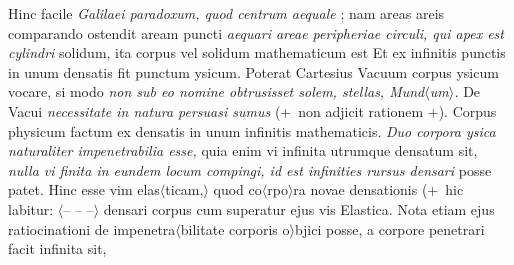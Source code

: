 Hinc facile
\textit{Galilaei\protect{}
paradoxum, quod centrum aequale
};
nam areas areis comparando ostendit aream puncti
\textit{aequari areae peripheriae circuli, qui apex est cylindri
}
solidum, ita corpus vel solidum mathematicum est 
Et ex infinitis punctis in unum densatis fit punctum ysicum.
\pend 
\pstart  Poterat Cartesius\protect{}
Vacuum corpus ysicum vocare, si modo \textit{non sub eo nomine obtrusisset solem\protect{}, stellas\protect{}, Mund$\langle$um$\rangle$.} De Vacui \textit{necessitate in natura persuasi sumus} (+~non adjicit rationem +). 
\pend 
\pstart%
Corpus physicum factum ex densatis in unum infinitis mathematicis.
\textit{Duo corpora ysica naturaliter impenetrabilia esse,}
quia enim vi infinita utrumque densatum sit,
\textit{nulla vi finita in eundem locum compingi, id est infinities rursus densari}
posse patet.
Hinc esse vim elas$\langle$ticam,$\rangle$
quod co$\langle$rpo$\rangle$ra novae densationis\protect{}
(+~hic labitur:
$\langle$-- -- --$\rangle$ densari corpus
cum superatur ejus vis Elastica.
Nota etiam ejus ratiocinationi de impenetra$\langle$bilitate\protect{}
corporis o$\rangle$bjici posse,
a corpore penetrari facit infinita sit,
